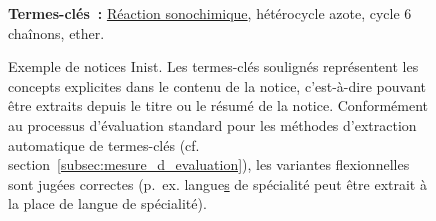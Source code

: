 \begin{figure}
\begin{minipage}{\linewidth}
{{          \vspace{-0.5em}
          \textbf{Termes-clés~:} \underline{Réaction sonochimique}, hétérocycle
          azote, cycle 6 chaînons, ether.
        }
      }
    \end{minipage}
    \caption{Exemple de notices Inist. Les termes-clés soulignés représentent
             les concepts explicites dans le contenu de la notice, c'est-à-dire
             pouvant être extraits depuis le titre ou le résumé de la
             notice. Conformément au processus d'évaluation standard pour les
             méthodes d'extraction automatique de termes-clés (cf.
             section~\ref{subsec:mesure_d_evaluation}), les variantes
             flexionnelles sont jugées correctes (p.~ex.
             \og{}langue\underline{s} de  spécialité\fg{} peut être extrait à la
             place de \og{}langue de spécialité\fg{}).
             \label{fig:exemple_notice_inist}}
  \end{figure}

